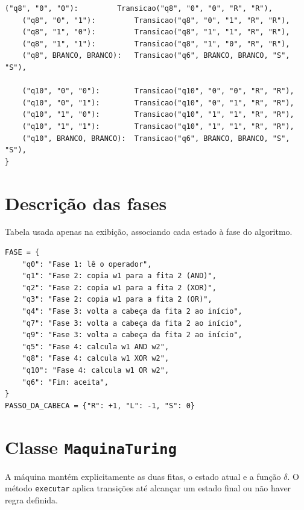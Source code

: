 \documentclass[report, 12pt]{uftreport}
\begin{document}
\begin{lstlisting}[style=python, caption={Função de transição $\delta$}, label={lst:delta}]
    ("q8", "0", "0"):         Transicao("q8", "0", "0", "R", "R"),
    ("q8", "0", "1"):         Transicao("q8", "0", "1", "R", "R"),
    ("q8", "1", "0"):         Transicao("q8", "1", "1", "R", "R"),
    ("q8", "1", "1"):         Transicao("q8", "1", "0", "R", "R"),
    ("q8", BRANCO, BRANCO):   Transicao("q6", BRANCO, BRANCO, "S", "S"),

    ("q10", "0", "0"):        Transicao("q10", "0", "0", "R", "R"),
    ("q10", "0", "1"):        Transicao("q10", "0", "1", "R", "R"),
    ("q10", "1", "0"):        Transicao("q10", "1", "1", "R", "R"),
    ("q10", "1", "1"):        Transicao("q10", "1", "1", "R", "R"),
    ("q10", BRANCO, BRANCO):  Transicao("q6", BRANCO, BRANCO, "S", "S"),
}
\end{lstlisting}

\section{Descrição das fases}

Tabela usada apenas na exibição, associando cada estado à fase do algoritmo.

\begin{lstlisting}[style=python, caption={Descrição das fases}, label={lst:fase}]
FASE = {
    "q0": "Fase 1: lê o operador",
    "q1": "Fase 2: copia w1 para a fita 2 (AND)",
    "q2": "Fase 2: copia w1 para a fita 2 (XOR)",
    "q3": "Fase 2: copia w1 para a fita 2 (OR)",
    "q4": "Fase 3: volta a cabeça da fita 2 ao início",
    "q7": "Fase 3: volta a cabeça da fita 2 ao início",
    "q9": "Fase 3: volta a cabeça da fita 2 ao início",
    "q5": "Fase 4: calcula w1 AND w2",
    "q8": "Fase 4: calcula w1 XOR w2",
    "q10": "Fase 4: calcula w1 OR w2",
    "q6": "Fim: aceita",
}
PASSO_DA_CABECA = {"R": +1, "L": -1, "S": 0}
\end{lstlisting}

\section{Classe \texttt{MaquinaTuring}}

A máquina mantém explicitamente as duas fitas, o estado atual e a função $\delta$. O método \texttt{executar} aplica transições até alcançar um estado final ou não haver regra definida.
\end{document}
